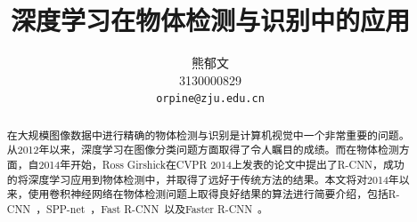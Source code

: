 \documentclass[10pt,twocolumn,letterpaper]{article}
\begin{document}
\title{深度学习在物体检测与识别中的应用}

\author{熊郁文\\
3130000829\\
{\tt\small orpine@zju.edu.cn}
}

\maketitle

\begin{abstract}
在大规模图像数据中进行精确的物体检测与识别是计算机视觉中一个非常重要的问题。从2012年以来，深度学习在图像分类问题方面取得了令人瞩目的成绩。而在物体检测方面，自2014年开始，Ross Girshick在CVPR 2014上发表的论文中提出了R-CNN，成功的将深度学习应用到物体检测中，并取得了远好于传统方法的结果。本文将对2014年以来，使用卷积神经网络在物体检测问题上取得良好结果的算法进行简要介绍，包括R-CNN~\cite{girshick14CVPR}，SPP-net~\cite{he2014spatial}，Fast R-CNN~\cite{girshickICCV15fastrcnn}以及Faster R-CNN~\cite{ren2015faster}。
\end{abstract}

\end{document}
